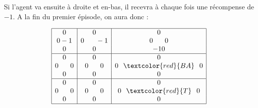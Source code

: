 \documentclass{beamer}
\begin{document}
\begin{frame}
Si l'agent va ensuite à droite et en-bas, il recevra à chaque fois une récompense de $-1$. A la fin du premier épisode, on aura donc : \pause
\begin{figure}[!ht]
\centering
$$\begin{array}{|c|c|c|}
\hline
0                      & 0                           & 0 \\
0 -1 & 0 \hspace*{0.6cm} -1 & 0\hspace*{0.6cm}0 \\
0          & 0          & -10 \\
\hline
0          & 0                            & 0 \\
0\hspace*{0.6cm}0   & 0\hspace*{0.6cm} 0                  & 0\hspace*{0.25cm}\textcolor{red}{B A}\hspace*{0.25cm} 0 \\
0           & 0          & 0 \\
\hline
0          & 0                         & 0\\
0\hspace*{0.6cm} 0                     & 0\hspace*{0.6cm}0                & 0\hspace*{0.25cm}\textcolor{red}{T}\hspace*{0.25cm} 0 \\
0                            & 0        & 0 \\
\hline
\end{array}
$$
\end{figure}

\end{frame}
\end{document}
